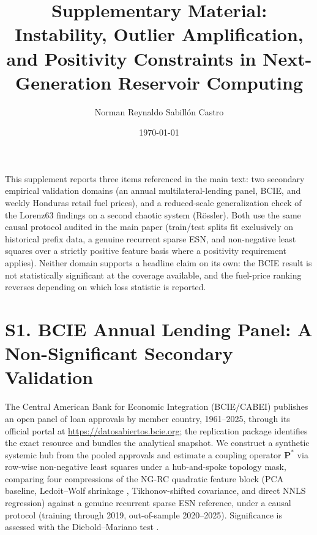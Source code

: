 \documentclass[aip,cha,reprint,amsmath,amssymb]{revtex4-2}
\begin{document}
\title{Supplementary Material: Instability, Outlier Amplification, and Positivity Constraints in Next-Generation Reservoir Computing}

\author{Norman Reynaldo Sabill{\'o}n Castro}

\date{\today}

\maketitle

\noindent This supplement reports three items referenced in the main text: two secondary empirical validation domains (an annual multilateral-lending panel, BCIE, and weekly Honduras retail fuel prices), and a reduced-scale generalization check of the Lorenz63 findings on a second chaotic system (R\"ossler). Both use the same causal protocol audited in the main paper (train/test splits fit exclusively on historical prefix data, a genuine recurrent sparse ESN, and non-negative least squares over a strictly positive feature basis where a positivity requirement applies). Neither domain supports a headline claim on its own: the BCIE result is not statistically significant at the coverage available, and the fuel-price ranking reverses depending on which loss statistic is reported.

\section{S1. BCIE Annual Lending Panel: A Non-Significant Secondary Validation}
\label{sec:bcie}

The Central American Bank for Economic Integration (BCIE/CABEI) publishes an open panel of loan approvals by member country, 1961--2025, through its official portal at \url{https://datosabiertos.bcie.org}; the replication package identifies the exact resource and bundles the analytical snapshot. We construct a synthetic systemic hub from the pooled approvals and estimate a coupling operator $\mathbf{P}^*$ via row-wise non-negative least squares under a hub-and-spoke topology mask, comparing four compressions of the NG-RC quadratic feature block (PCA baseline, Ledoit--Wolf shrinkage \cite{ledoitwolf2004wellconditioned}, Tikhonov-shifted covariance, and direct NNLS regression) against a genuine recurrent sparse ESN reference, under a causal protocol (training through 2019, out-of-sample 2020--2025). Significance is assessed with the Diebold--Mariano test \cite{dieboldmariano1995comparing}.
\end{document}
